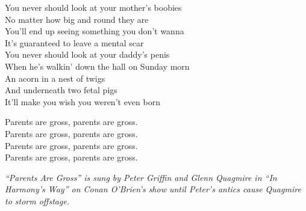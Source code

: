 \vspace{10pt}
You never should look at your mother's boobies\\
No matter how big and round they are\\
You'll end up seeing something you don't wanna\\
It's guaranteed to leave a mental scar\\
You never should look at your daddy's penis\\
When he's walkin' down the hall on Sunday morn\\
An acorn in a nest of twigs\\
And underneath two fetal pigs\\
It'll make you wish you weren't even born\par
\vspace{10pt}
Parents are gross, parents are gross.\\
Parents are gross, parents are gross.\\
Parents are gross, parents are gross.\\
Parents are gross, parents are gross.\par
\vspace{10pt}
{\footnotesize\textit{``Parents Are Gross'' is sung by Peter Griffin and Glenn Quagmire in ``In Harmony's Way'' on Conan O'Brien's show until Peter's antics cause Quagmire to storm offstage.}}
